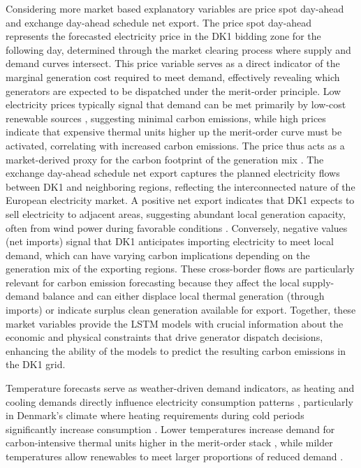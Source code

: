 Considering more market based explanatory variables are price spot day-ahead and exchange day-ahead schedule net export. The price spot day-ahead represents the forecasted electricity price in the DK1 bidding zone for the following day, determined through the market clearing process where supply and demand curves intersect. This price variable serves as a direct indicator of the marginal generation cost required to meet demand, effectively revealing which generators are expected to be dispatched under the merit-order principle. Low electricity prices typically signal that demand can be met primarily by low-cost renewable sources \parencite{sensfuss2008}, suggesting minimal carbon emissions, while high prices indicate that expensive thermal units higher up the merit-order curve must be activated, correlating with increased carbon emissions. The price thus acts as a market-derived proxy for the carbon footprint of the generation mix \parencite{wang2017}. The exchange day-ahead schedule net export captures the planned electricity flows between DK1 and neighboring regions, reflecting the interconnected nature of the European electricity market. A positive net export indicates that DK1 expects to sell electricity to adjacent areas, suggesting abundant local generation capacity, often from wind power during favorable conditions \parencite{green2012}. Conversely, negative values (net imports) signal that DK1 anticipates importing electricity to meet local demand, which can have varying carbon implications depending on the generation mix of the exporting regions. These cross-border flows are particularly relevant for carbon emission forecasting because they affect the local supply-demand balance and can either displace local thermal generation (through imports) or indicate surplus clean generation available for export. Together, these market variables provide the LSTM models with crucial information about the economic and physical constraints that drive generator dispatch decisions, enhancing the ability of the models to predict the resulting carbon emissions in the DK1 grid.

Temperature forecasts serve as weather-driven demand indicators, as heating and cooling demands directly influence electricity consumption patterns \parencite{yao2021}, particularly in Denmark's climate where heating requirements during cold periods significantly increase consumption \parencite{cassarino2018}. Lower temperatures increase demand for carbon-intensive thermal units higher in the merit-order stack \parencite{sensfuss2008}, while milder temperatures allow renewables to meet larger proportions of reduced demand \parencite{gils2014}.

